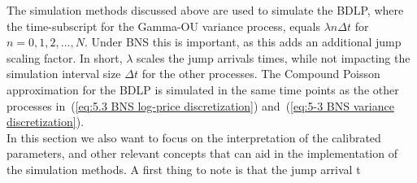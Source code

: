 The simulation methods discussed above are used to simulate the BDLP, where the time-subscript for the Gamma-OU variance process, equals $\lambda n \Delta t$ for $n=0,1,2,...,N$. Under BNS this is important, as this adds an additional jump scaling factor. In short, $\lambda$ scales the jump arrivals times, while not impacting the simulation interval size $\Delta t$ for the other processes. The Compound Poisson approximation for the BDLP is simulated in the same time points as the other processes in~(\ref{eq:5.3 BNS log-price discretization}) and~(\ref{eq:5-3 BNS variance discretization}).\\

In this section we also want to focus on the interpretation of the calibrated parameters, and other relevant concepts that can aid in the implementation of the simulation methods. A first thing to note is that the jump arrival t 



